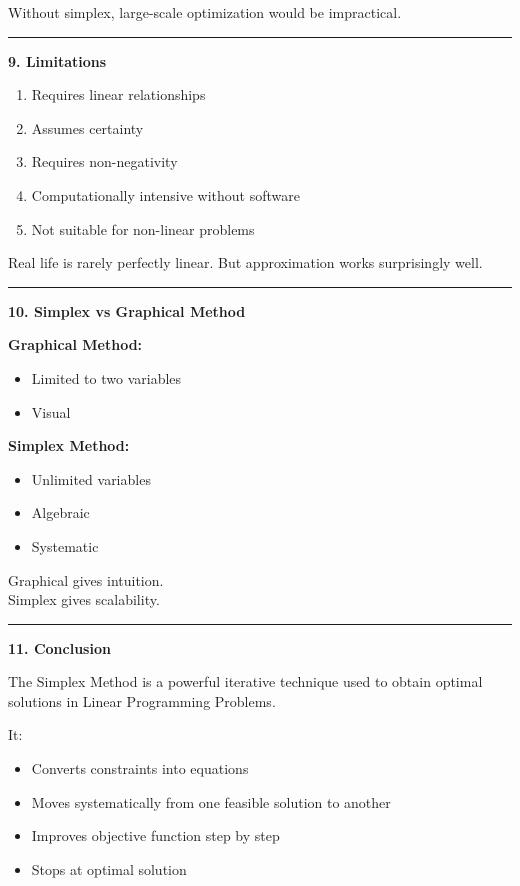 \documentclass[10pt,a4paper]{article}
\newcommand{\separator}{\vspace{0.4em}\noindent\rule{\linewidth}{0.6pt}\vspace{0.4em}}
\begin{document}
Without simplex, large-scale optimization would be impractical.

\separator

\textbf{9. Limitations}

\begin{enumerate}
  \item Requires linear relationships
  \item Assumes certainty
  \item Requires non-negativity
  \item Computationally intensive without software
  \item Not suitable for non-linear problems
\end{enumerate}

Real life is rarely perfectly linear.
But approximation works surprisingly well.

\separator

\textbf{10. Simplex vs Graphical Method}

\textbf{Graphical Method:}
\begin{itemize}
  \item Limited to two variables
  \item Visual
\end{itemize}

\textbf{Simplex Method:}
\begin{itemize}
  \item Unlimited variables
  \item Algebraic
  \item Systematic
\end{itemize}

Graphical gives intuition.\\
Simplex gives scalability.

\separator

\textbf{11. Conclusion}

The Simplex Method is a powerful iterative technique used to obtain optimal solutions in
Linear Programming Problems.

It:
\begin{itemize}
  \item Converts constraints into equations
  \item Moves systematically from one feasible solution to another
  \item Improves objective function step by step
  \item Stops at optimal solution
\end{itemize}
\end{document}

